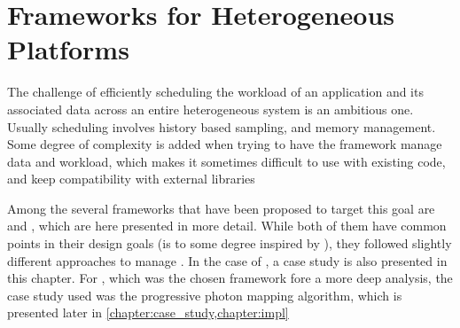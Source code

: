 \documentclass[main.tex]{subfiles}
\begin{document}
\chapter{Frameworks for Heterogeneous Platforms} \label{chapter:frameworks}

The challenge of efficiently scheduling the workload of an application and its associated data across an entire heterogeneous system is an ambitious one. Usually scheduling involves history based sampling, and memory management. Some degree of complexity is added when trying to have the framework manage data and workload, which makes it sometimes difficult to use with existing code, and keep compatibility with external libraries

Among the several frameworks that have been proposed to target this goal are \gama and \starpu, which are here presented in more detail.
While both of them have common points in their design goals (\gama is to some degree inspired by \starpu), they followed slightly different approaches to manage \hetplats. In the case of \gama, a case study is also presented in this chapter. For \starpu, which was the chosen framework fore a more deep analysis, the case study used was the progressive photon mapping algorithm, which is presented later in \cref{chapter:case_study,chapter:impl}




\end{document}
